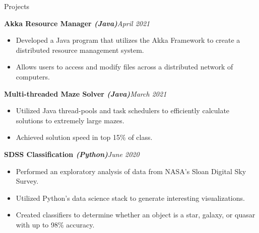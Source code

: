 \documentclass{resume} %
\begin{document}
\begin{rSection}{Projects}

\begin{rSubsection}{\bf Akka Resource Manager \hspace{0.1em} \it (Java)}{\em April 2021}{}{}
\begin{itemize}
    \item Developed a Java program that utilizes the Akka Framework to create a distributed resource management system.\vspace{-0.6em}
    \item Allows users to access and modify files across a distributed network of computers.
\end{itemize}
\end{rSubsection}

\begin{rSubsection}{\bf Multi-threaded Maze Solver \hspace{0.1em} \it (Java)}{\em March 2021}{}{}
\begin{itemize}
    \item Utilized Java thread-pools and task schedulers to efficiently calculate solutions to extremely large mazes.\vspace{-0.6em}
    \item Achieved solution speed in top 15\% of class.
\end{itemize}
\end{rSubsection}

\begin{rSubsection}{\bf SDSS Classification \hspace{0.1em} \it (Python)}{\em June 2020}{}{}
\begin{itemize}
    \item Performed an exploratory analysis of data from NASA's Sloan Digital Sky Survey. \vspace{-0.6em}
    \item Utilized Python's data science stack to generate interesting visualizations. \vspace{-0.6em}
    \item Created classifiers to determine whether an object is a star, galaxy, or quasar with up to 98\% accuracy.
\end{itemize}
\end{rSubsection}



\end{rSection}
\end{document}
